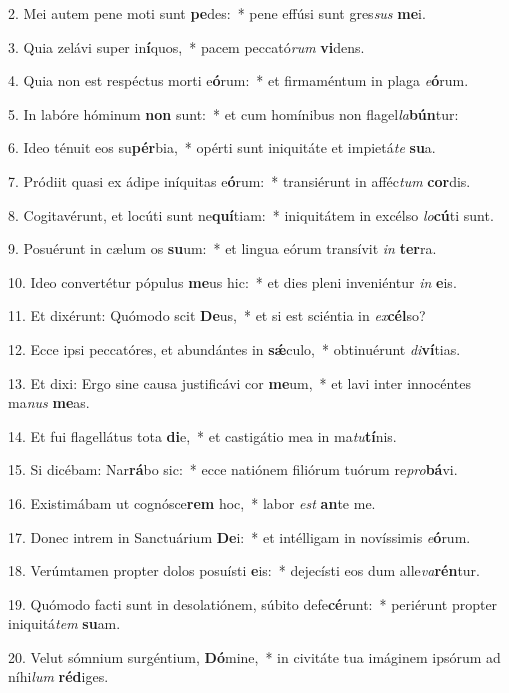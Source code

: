 2. Mei autem pene moti sunt \textbf{pe}des:~*  pene effúsi sunt gres\textit{sus} \textbf{me}i.\

3. Quia zelávi super in\textbf{í}quos,~*  pacem peccató\textit{rum} \textbf{vi}dens.\

4. Quia non est respéctus morti e\textbf{ó}rum:~*  et firmaméntum in plaga \textit{e}\textbf{ó}rum.\

5. In labóre hóminum \textbf{non} sunt:~*  et cum homínibus non flagel\textit{la}\textbf{bún}tur:\

6. Ideo ténuit eos su\textbf{pér}bia,~*  opérti sunt iniquitáte et impietá\textit{te} \textbf{su}a.\

7. Pródiit quasi ex ádipe iníquitas e\textbf{ó}rum:~*  transiérunt in afféc\textit{tum} \textbf{cor}dis.\

8. Cogitavérunt, et locúti sunt ne\textbf{quí}tiam:~*  iniquitátem in excélso \textit{lo}\textbf{cú}ti sunt.\

9. Posuérunt in cælum os \textbf{su}um:~*  et lingua eórum transívit \textit{in} \textbf{ter}ra.\

10. Ideo convertétur pópulus \textbf{me}us hic:~*  et dies pleni inveniéntur \textit{in} \textbf{e}is.\

11. Et dixérunt: Quómodo scit \textbf{De}us,~*  et si est sciéntia in \textit{ex}\textbf{cél}so?\

12. Ecce ipsi peccatóres, et abundántes in \textbf{sǽ}culo,~*  obtinuérunt \textit{di}\textbf{ví}tias.\

13. Et dixi: Ergo sine causa justificávi cor \textbf{me}um,~*  et lavi inter innocéntes ma\textit{nus} \textbf{me}as.\

14. Et fui flagellátus tota \textbf{di}e,~*  et castigátio mea in ma\textit{tu}\textbf{tí}nis.\

15. Si dicébam: Nar\textbf{rá}bo sic:~*  ecce natiónem filiórum tuórum re\textit{pro}\textbf{bá}vi.\

16. Existimábam ut cognósce\textbf{rem} hoc,~*  labor \textit{est} \textbf{an}te me.\

17. Donec intrem in Sanctuárium \textbf{De}i:~*  et intélligam in novíssimis \textit{e}\textbf{ó}rum.\

18. Verúmtamen propter dolos posuísti \textbf{e}is:~*  dejecísti eos dum alle\textit{va}\textbf{rén}tur.\

19. Quómodo facti sunt in desolatiónem, súbito defe\textbf{cé}runt:~*  periérunt propter iniquitá\textit{tem} \textbf{su}am.\

20. Velut sómnium surgéntium, \textbf{Dó}mine,~*  in civitáte tua imáginem ipsórum ad níhi\textit{lum} \textbf{réd}iges.\

